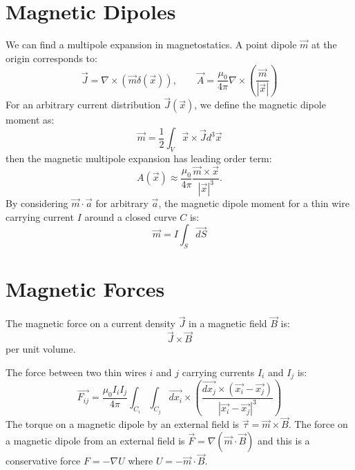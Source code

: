 \documentclass[../Main.tex]{subfiles}
\begin{document}
\section{Magnetic Dipoles}
We can find a multipole expansion in magnetostatics. A point dipole $\vec{m}$ at the origin corresponds to:
\begin{equation*}
    \vec{J} = \nabla \times (\vec{m}\delta(\vec{x})),\qquad \vec{A} = \frac{\mu_0}{4\pi} \nabla \times \left(\frac{\vec{m}}{|\vec{x}|}\right)
\end{equation*}
For an arbitrary current distribution $\vec{J}(\vec{x})$, we define the magnetic dipole moment as:
\begin{equation*}
    \vec{m} = \frac12 \int_V \vec{x} \times \vec{J} d^3\vec{x}
\end{equation*}
then the magnetic multipole expansion has leading order term:
\begin{equation*}
    A(\vec{x}) \approx \frac{\mu_0}{4\pi} \frac{\vec{m} \times \vec{x}}{|\vec{x}|^3}.
\end{equation*}
By considering $\vec{m} \cdot \vec{a}$ for arbitrary $\vec{a}$, the magnetic dipole moment for a thin wire carrying current $I$ around a closed curve $C$ is:
\begin{equation*}
    \vec{m} = I \int_S \vec{dS}
\end{equation*}
\section{Magnetic Forces}
The magnetic force on a current density $\vec{J}$ in a magnetic field $\vec{B}$ is:
\begin{equation*}
    \vec{J} \times \vec{B}
\end{equation*}
per unit volume.

The force between two thin wires $i$ and $j$ carrying currents $I_i$ and $I_j$ is:
\begin{equation*}
    \vec{F_{ij}} = \frac{\mu_0 I_i I_j}{4\pi} \int_{C_i} \int_{C_j} \vec{dx_i} \times \left(\frac{\vec{dx_j} \times (\vec{x_i} - \vec{x_j})}{|\vec{x_i} - \vec{x_j}|^3}\right)
\end{equation*}
The torque on a magnetic dipole by an external field is $\vec{\tau} = \vec{m} \times \vec{B}$. The force on a magnetic dipole from an external field is $\vec{F} = \nabla (\vec{m} \cdot \vec{B})$ and this is a conservative force $F = -\nabla U$ where $U = -\vec{m} \cdot \vec{B}$.
\end{document}
